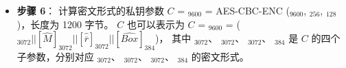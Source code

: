 \documentclass[main\_\_CN.tex]{subfiles}
\begin{document}
\begin{itemize}
    \item {\bfseries 步骤 6}：
            计算密文形式的私钥参数 \begin{math}C\end{math} = \begin{math}[C]_{9600}\end{math} = 
            AES-CBC-ENC (\begin{math}[P]_{9600}\end{math}, \begin{math}[DS\_KEY]_{256}\end{math}, \begin{math}[IV]_{128}\end{math})，长度为 1200 字节。
            \begin{math}C\end{math} 也可以表示为
            \begin{math}C\end{math} = \begin{math}[C]_{9600}\end{math} = 
            (\begin{math}
            [\widehat{Y}]_{3072} ||
            [\widehat{M}]_{3072} ||
            [\widehat{ \overline{r} }]_{3072} ||
            [\widehat{Box}]_{384} 
            \end{math})，
            其中
            \begin{math} [\widehat{Y}]_{3072} \end{math}、
            \begin{math} [\widehat{M}]_{3072} \end{math}、
            \begin{math} [\widehat{ \overline{r} }]_{3072} \end{math}、
            \begin{math} [\widehat{Box}]_{384} \end{math}
            是 \begin{math}C\end{math} 的四个子参数，分别对应
            \begin{math} [Y]_{3072} \end{math}、
            \begin{math} [M]_{3072} \end{math}、
            \begin{math} [\overline{r}]_{3072} \end{math}、
            \begin{math} [Box]_{384} \end{math}
            的密文形式。
    
\end{itemize}
\end{document}
